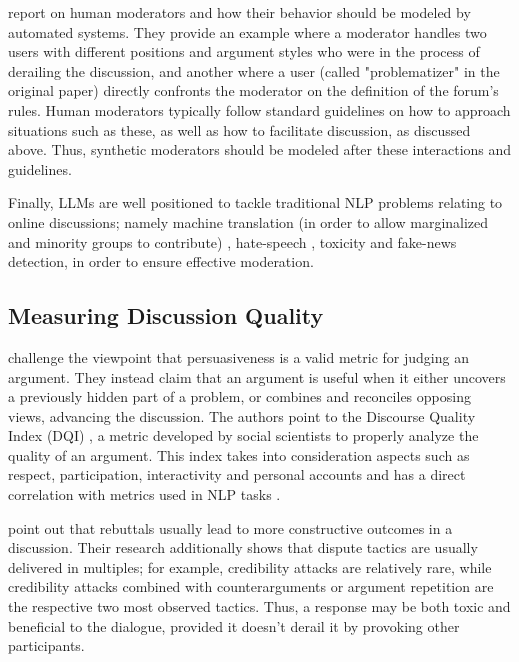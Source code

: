 \citet{vecchi-2021-towards} report on human moderators and how their behavior should be modeled by automated systems. They provide an example where a moderator handles two users with different positions and argument styles who were in the process of derailing the discussion, and another where a user (called "problematizer" in the original paper) directly confronts the moderator on the definition of the forum's rules. Human moderators typically follow standard guidelines on how to approach situations such as these, as well as how to facilitate discussion, as discussed above. Thus, synthetic moderators should be modeled after these interactions and guidelines.

Finally, LLMs are well positioned to tackle traditional NLP problems relating to online discussions; namely machine translation (in order to allow marginalized and minority groups to contribute) \cite{Tsai2024Generative}, hate-speech \cite{Nirmal2024TowardsIH, shi-2024-hatespeech}, toxicity \cite{kang-qian-2024-implanting, Wang2022ToxicityDW} and fake-news \cite{Liu2024DetectIJ, Xu2024ACS, Xu2024ACS} detection, in order to ensure effective moderation. 


\subsection{Measuring Discussion Quality}
\label{sec:related:measures}

\citet{vecchi-2021-towards} challenge the viewpoint that persuasiveness is a valid metric for judging an argument. They instead claim that an argument is useful when it either uncovers a previously hidden part of a problem, or combines and reconciles opposing views, advancing the discussion. The authors point to the Discourse Quality Index (DQI) \cite{Steiner2005-STEDPI-8, stab-gurevych-2017-parsing}, a metric developed by social scientists to properly analyze the quality of an argument. This index takes into consideration aspects such as respect, participation, interactivity and personal accounts and has a direct correlation with metrics used in NLP tasks \cite{wachsmuth-etal-2017-computational}. 

\cite{dekock2022disagree} point out that rebuttals usually lead to more constructive outcomes in a discussion. Their research additionally shows that dispute tactics are usually delivered in multiples; for example, credibility attacks are relatively rare, while credibility attacks combined with counterarguments or argument repetition are the respective two most observed tactics. Thus, a response may be both toxic and beneficial to the dialogue, provided it doesn't derail it by provoking other participants.

